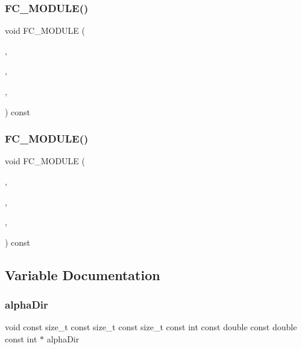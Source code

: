 \subsubsection{\texorpdfstring{F\+C\+\_\+\+M\+O\+D\+U\+L\+E()}{FC\_MODULE()}\hspace{0.1cm}{\footnotesize\ttfamily [8/9]}}
{\footnotesize\ttfamily void F\+C\+\_\+\+M\+O\+D\+U\+LE (\begin{DoxyParamCaption}\item[{metricops}]{,  }\item[{pointeigenvectors}]{,  }\item[{M\+E\+T\+R\+I\+C\+O\+PS}]{,  }\item[{P\+O\+I\+N\+T\+E\+I\+G\+E\+N\+V\+E\+C\+T\+O\+RS}]{ }\end{DoxyParamCaption}) const}

\hypertarget{MetricKernels_8H_a430b5fdc23ceede4fabf0b0fb1a9a4ea}{}\label{MetricKernels_8H_a430b5fdc23ceede4fabf0b0fb1a9a4ea} 
\subsubsection{\texorpdfstring{F\+C\+\_\+\+M\+O\+D\+U\+L\+E()}{FC\_MODULE()}\hspace{0.1cm}{\footnotesize\ttfamily [9/9]}}
{\footnotesize\ttfamily void F\+C\+\_\+\+M\+O\+D\+U\+LE (\begin{DoxyParamCaption}\item[{metricops}]{,  }\item[{pointeigenvectorsgs}]{,  }\item[{M\+E\+T\+R\+I\+C\+O\+PS}]{,  }\item[{P\+O\+I\+N\+T\+E\+I\+G\+E\+N\+V\+E\+C\+T\+O\+R\+S\+GS}]{ }\end{DoxyParamCaption}) const}



\subsection{Variable Documentation}
\hypertarget{MetricKernels_8H_a3d083d604bcbd48cccc0421f5328f574}{}\label{MetricKernels_8H_a3d083d604bcbd48cccc0421f5328f574} 
\subsubsection{\texorpdfstring{alpha\+Dir}{alphaDir}}
{\footnotesize\ttfamily void const size\+\_\+t const size\+\_\+t const size\+\_\+t const int const double const double const int $\ast$ alpha\+Dir}



